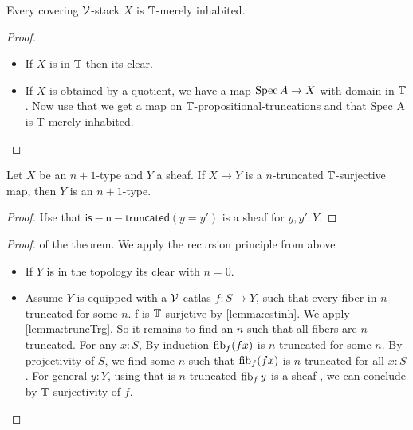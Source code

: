 \documentclass{article}
\begin{document}
\begin{lemma}{\label{lemma:cstinh}}
	Every covering $\mathcal{V}$-stack $X$ is $\mathbb{T}$-merely inhabited.

\end{lemma}
\begin{proof} 
	\begin{itemize}
		\item If $X$ is in $\mathbb{T}$ then its clear.
		\item  If $X$ is obtained by a quotient, we have a map $\operatorname{Spec} A \to X$ with domain in $\mathbb{T}$. Now use that we get a map on $\mathbb{T}$-propositional-truncations and that Spec A is T-merely inhabited.
		\end{itemize}
\end{proof}
\begin{lemma}{\label{lemma:truncTrg}}
	Let $X$ be an $n+1$-type and $Y$ a sheaf. If $X \to Y$ is a $n$-truncated $\mathbb{T}$-surjective map, then $Y$ is an $n+1$-type.
\end{lemma}
\begin{proof}
	Use that $\mathsf{is-n-truncated} (y=y')$ is a sheaf for $y , y' : Y.$
\end{proof}

\begin{proof} of the theorem.
	We apply the recursion principle from above
\begin{itemize}
	\item If $Y$ is in the topology its clear with $n = 0$.
	\item Assume $Y$ is equipped with a $\mathcal{V}$-catlas $f : S \to Y$, such that every fiber in $n$-truncated for some $n$. f is $\mathbb{T}$-surjetive by \ref{lemma:cstinh}.
	We apply \ref{lemma:truncTrg}.
	So it remains to find an $n$ such that all fibers are $n$-truncated.
	For any $x : S$, By induction $\operatorname{fib}_f (f x)$ is $n$-truncated for some $n$. By projectivity of $S$, we find some $n$ such that $\operatorname{fib}_f (f x)$ is $n$-truncated for all $x : S$. For general $y : Y$, using that is-$n$-truncated $\operatorname{fib}_f y$ is a sheaf , we can conclude by $\mathbb{T}$-surjectivity of $f$.
\end{itemize}

%

\end{proof}
\end{document}
